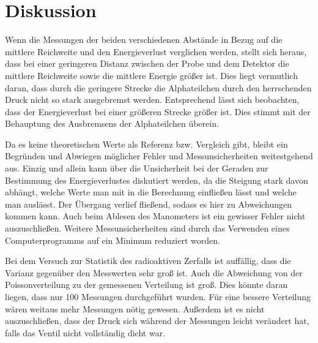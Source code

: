 \section{Diskussion}
\label{sec:Diskussion}
Wenn die Messungen der beiden verschiedenen Abstände in Bezug auf die mittlere Reichweite und den Energieverlust verglichen werden, stellt sich heraus, 
dass bei einer geringeren Distanz zwischen der Probe und dem Detektor die mittlere Reichweite sowie die mittlere Energie größer ist. Dies liegt vermutlich
daran, dass durch die geringere Strecke die Alphateilchen durch den herrschenden Druck nicht so stark ausgebremst werden. Entsprechend lässt sich beobachten, 
dass der Energieverlust bei einer größeren Strecke größer ist. Dies stimmt mit der Behauptung des Ausbremsens der Alphateilchen überein.

Da es keine theoretischen Werte als Referenz bzw. Vergleich gibt, bleibt ein Begründen und Abwiegen möglicher Fehler und 
Messunsicherheiten weitestgehend aus.
Einzig und allein kann über die Unsicherheit bei der Geraden zur Bestimmung des Energieverlustes diskutiert werden,
da die Steigung stark davon abhängt, welche Werte man mit in die Berechnung einfließen lässt und welche man auslässt.
Der Übergang verlief fließend, sodass es hier zu Abweichungen kommen kann.
Auch beim Ablesen des Manometers ist ein gewisser Fehler nicht auszuschließen. Weitere Messunsicherheiten sind durch das Verwenden eines 
Computerprogramms auf ein Minimum reduziert worden.

Bei dem Versuch zur Statistik des radioaktiven Zerfalls ist auffällig, dass die Varianz gegenüber den Messwerten sehr groß ist. Auch die Abweichung von der
Poissonverteilung zu der gemessenen Verteilung ist groß. Dies könnte daran liegen, dass nur 100 Messungen durchgeführt wurden. Für eine bessere Verteilung
wären weitaus mehr Messungen nötig gewesen. Außerdem ist es nicht auszuschließen, dass der Druck sich während der Messungen leicht verändert hat, falls das Ventil 
nicht vollständig dicht war.
